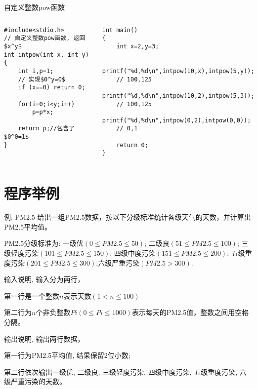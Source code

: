 \begin{frame}{自定义整数pow函数}
\vspace{-0.5cm}
\begin{columns}[T]
\begin{lstlisting}
#include<stdio.h>
// 自定义整数pow函数, 返回$x^y$
int intpow(int x, int y)
{
	int i,p=1;
	// 实现$0^y=0$
	if (x==0) return 0;
	
	for(i=0;i<y;i++) 
		p=p*x;
	
	return p;//包含了$0^0=1$
} 
\end{lstlisting}
\begin{lstlisting}[frame=leftline]
int main()
{
	int x=2,y=3;
	
	printf("%d,%d\n",intpow(10,x),intpow(5,y)); 
	// 100,125
	printf("%d,%d\n",intpow(10,2),intpow(5,3)); 
	// 100,125
	printf("%d,%d\n",intpow(0,2),intpow(0,0)); 
	// 0,1 
	
	return 0;
}
\end{lstlisting}
\end{columns}
\end{frame}



\section{程序举例}

\begin{frame}{例: PM2.5}
给出一组PM2.5数据，按以下分级标准统计各级天气的天数，并计算出PM2.5平均值。

PM2.5分级标准为: 
一级优$(0\le PM2.5\le 50)$; 二级良$(51\le PM2.5\le 100)$;  三级轻度污染$(101\le PM2.5\le 150)$; 四级中度污染$(151\le PM2.5\le 200)$; 五级重度污染$(201\le PM2.5\le 300)$;六级严重污染$(PM2.5>300)$.

输入说明, 输入分为两行，

第一行是一个整数$n$表示天数$(1<n\le 100)$ 

第二行为$n$个非负整数$Pi(0\le Pi\le 1000)$表示每天的PM2.5值，整数之间用空格分隔。

输出说明, 输出两行数据，

第一行为PM2.5平均值, 结果保留2位小数; 

第二行依次输出一级优, 二级良, 三级轻度污染, 四级中度污染, 五级重度污染, 六级严重污染的天数。
\end{frame}

